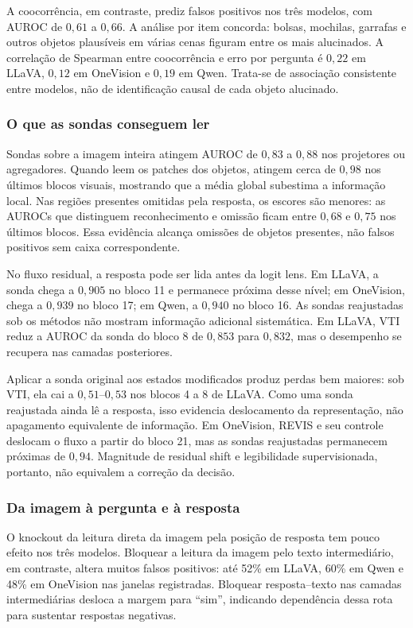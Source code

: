 A coocorrência, em contraste, prediz falsos positivos nos três modelos, com AUROC de $0{,}61$ a $0{,}66$. A análise por item concorda: bolsas, mochilas, garrafas e outros objetos plausíveis em várias cenas figuram entre os mais alucinados. A correlação de Spearman entre coocorrência e erro por pergunta é $0{,}22$ em LLaVA, $0{,}12$ em OneVision e $0{,}19$ em Qwen. Trata-se de associação consistente entre modelos, não de identificação causal de cada objeto alucinado.

\subsubsection{O que as sondas conseguem ler}
Sondas sobre a imagem inteira atingem AUROC de $0{,}83$ a $0{,}88$ nos projetores ou agregadores. Quando leem os patches dos objetos, atingem cerca de $0{,}98$ nos últimos blocos visuais, mostrando que a média global subestima a informação local. Nas regiões presentes omitidas pela resposta, os escores são menores: as AUROCs que distinguem reconhecimento e omissão ficam entre $0{,}68$ e $0{,}75$ nos últimos blocos. Essa evidência alcança omissões de objetos presentes, não falsos positivos sem caixa correspondente.

No fluxo residual, a resposta pode ser lida antes da logit lens. Em LLaVA, a sonda chega a $0{,}905$ no bloco 11 e permanece próxima desse nível; em OneVision, chega a $0{,}939$ no bloco 17; em Qwen, a $0{,}940$ no bloco 16. As sondas reajustadas sob os métodos não mostram informação adicional sistemática. Em LLaVA, VTI reduz a AUROC da sonda do bloco 8 de $0{,}853$ para $0{,}832$, mas o desempenho se recupera nas camadas posteriores.

Aplicar a sonda original aos estados modificados produz perdas bem maiores: sob VTI, ela cai a $0{,}51$--$0{,}53$ nos blocos 4 a 8 de LLaVA. Como uma sonda reajustada ainda lê a resposta, isso evidencia deslocamento da representação, não apagamento equivalente de informação. Em OneVision, REVIS e seu controle deslocam o fluxo a partir do bloco 21, mas as sondas reajustadas permanecem próximas de $0{,}94$. Magnitude de residual shift e legibilidade supervisionada, portanto, não equivalem a correção da decisão.

\subsubsection{Da imagem à pergunta e à resposta}
O knockout da leitura direta da imagem pela posição de resposta tem pouco efeito nos três modelos. Bloquear a leitura da imagem pelo texto intermediário, em contraste, altera muitos falsos positivos: até 52\% em LLaVA, 60\% em Qwen e 48\% em OneVision nas janelas registradas. Bloquear resposta--texto nas camadas intermediárias desloca a margem para ``sim'', indicando dependência dessa rota para sustentar respostas negativas.

